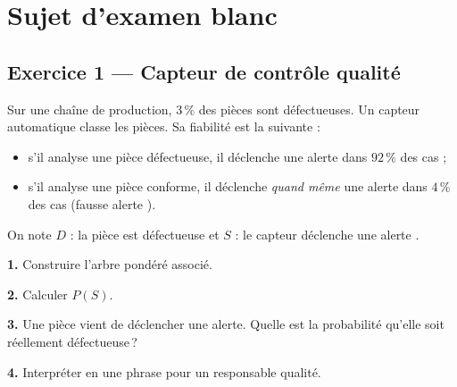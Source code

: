 \section*{Sujet d'examen blanc}

\subsection*{Exercice 1 --- Capteur de contrôle qualité}

Sur une chaîne de production, $3\,\%$ des pièces sont défectueuses. Un capteur automatique classe les pièces. Sa fiabilité est la suivante :
\begin{itemize}\setlength{\itemsep}{0.1em}
  \item s'il analyse une pièce défectueuse, il déclenche une alerte dans $92\,\%$ des cas ;
  \item s'il analyse une pièce conforme, il déclenche \emph{quand même} une alerte dans $4\,\%$ des cas (\og fausse alerte \fg).
\end{itemize}

On note $D$ : \og la pièce est défectueuse \fg{} et $S$ : \og le capteur déclenche une alerte \fg.

\textbf{1.} Construire l'arbre pondéré associé.

\textbf{2.} Calculer $P(S)$.

\textbf{3.} Une pièce vient de déclencher une alerte. Quelle est la probabilité qu'elle soit réellement défectueuse\,?

\textbf{4.} Interpréter en une phrase pour un responsable qualité.


